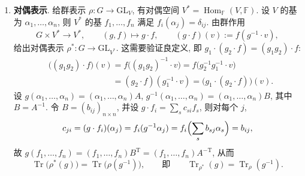 \begin{example}
\begin{enumerate}
即其 $(si,tj)$ 元为 $a_{si}b_{tj}$. 按块写则为
\begin{equation*}
  C=A\otimes B=
  \begin{pmatrix}
    a_{11}B & a_{12}B & \cdots & a_{1m}B\\
    a_{21}B & a_{22}B & \cdots & a_{2m}B\\
    \vdots  & \vdots  & \ddots & \vdots\\
    a_{m1}B & a_{m2}B & \cdots & a_{mm}B
  \end{pmatrix}_{mn\times mn},
\end{equation*}
其中 $a_{ij}B$ 为 $n\times n$ 的块. 于是
\begin{equation*}
  \operatorname{Tr}(C)=\operatorname{Tr}(A\otimes B)=\sum_i a_{ii}\operatorname{Tr}(B)
  =\operatorname{Tr}(A)\cdot\operatorname{Tr}(B),
\end{equation*}
即 $\operatorname{Tr}_{\rho_1\otimes\rho_2}=\operatorname{Tr}_{\rho_1}\operatorname{Tr}_{\rho_2}\colon G\to \mathbb{F}$.

\item \textbf{对偶表示}. 给群表示 $\rho\colon G\to\mathrm{GL}_V$, 有对偶空间 $V^*=\operatorname{Hom}_{\mathbb{F}}(V,\mathbb{F})$.
设 $V$ 的基为 $\alpha_1,\dots,\alpha_n$, 则 $V^*$ 的基 $f_1,\dots,f_n$ 满足 $f_i(\alpha_j)=\delta_{ij}$.
由群作用
\begin{equation*}
  G\times V^*\longrightarrow V^*,\qquad (g,f)\longmapsto g\cdot f,\qquad
  (g\cdot f)(v):=f(g^{-1}\cdot v),
\end{equation*}
给出对偶表示 $\rho^*\colon G\to\mathrm{GL}_{V^*}$.
这需要验证良定义, 即 $g_1\cdot(g_2\cdot f)=(g_1g_2)\cdot f$:
\[\begin{aligned}
  &\bigl((g_1g_2)\cdot f\bigr)(v)=f\bigl((g_1g_2)^{-1}\cdot v\bigr)=f\bigl(g_2^{-1}g_1^{-1}\cdot v\bigr)\\
  &\phantom{\bigl((g_1g_2)\cdot f\bigr)(v)}=(g_2\cdot f)(g_1^{-1}\cdot v)=\bigl(g_1\cdot(g_2\cdot f)\bigr)(v).
\end{aligned}\]
设 $g(\alpha_1,\dots,\alpha_n)=(\alpha_1,\dots,\alpha_n)A$, $g^{-1}(\alpha_1,\dots,\alpha_n)=(\alpha_1,\dots,\alpha_n)B$,
其中 $B=A^{-1}$. 令 $B=(b_{ij})_{n\times n}$, 并设 $g\cdot f_i=\sum_s c_{si}f_s$, 则对每个 $j$,
\begin{equation*}
  c_{ji}=(g\cdot f_i)(\alpha_j)=f_i(g^{-1}\alpha_j)=f_i\Bigl(\sum_s b_{sj}\alpha_s\Bigr)=b_{ij},
\end{equation*}
故 $g(f_1,\dots,f_n)=(f_1,\dots,f_n)B^{\mathrm{T}}=(f_1,\dots,f_n)A^{-\mathrm{T}}$, 从而
\begin{equation*}
  \operatorname{Tr}\bigl(\rho^*(g)\bigr)=\operatorname{Tr}\bigl(\rho(g^{-1})\bigr),
  \qquad\text{即}\qquad \operatorname{Tr}_{\rho^*}(g)=\operatorname{Tr}_\rho(g^{-1}).
\end{equation*}


\end{enumerate}
\end{example}
